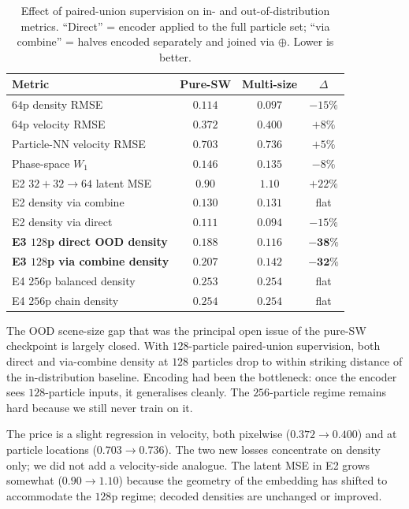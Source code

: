 \documentclass[11pt]{article}
\newcommand{\combine}{\oplus}
\begin{document}
\begin{table}[t]
\centering
\caption{Effect of paired-union supervision on in- and out-of-distribution metrics. ``Direct'' = encoder applied to the full particle set; ``via combine'' = halves encoded separately and joined via $\combine$. Lower is better.}
\label{tab:multisize}
\begin{tabular}{lccc}
\toprule
Metric & Pure-SW & Multi-size & $\Delta$ \\
\midrule
$64$p density RMSE & $0.114$ & $\mathbf{0.097}$ & $-15\%$ \\
$64$p velocity RMSE & $0.372$ & $0.400$ & $+8\%$ \\
Particle-NN velocity RMSE & $0.703$ & $0.736$ & $+5\%$ \\
Phase-space $W_1$ & $0.146$ & $0.135$ & $-8\%$ \\
\midrule
E2 $32{+}32 \to 64$ latent MSE & $0.90$ & $1.10$ & $+22\%$ \\
E2 density via combine & $0.130$ & $0.131$ & flat \\
E2 density via direct & $0.111$ & $0.094$ & $-15\%$ \\
\midrule
\textbf{E3 $128$p direct OOD density} & $0.188$ & $\mathbf{0.116}$ & $\mathbf{-38\%}$ \\
\textbf{E3 $128$p via combine density} & $0.207$ & $\mathbf{0.142}$ & $\mathbf{-32\%}$ \\
\midrule
E4 $256$p balanced density & $0.253$ & $0.254$ & flat \\
E4 $256$p chain density & $0.254$ & $0.254$ & flat \\
\bottomrule
\end{tabular}
\end{table}

The OOD scene-size gap that was the principal open issue of the pure-SW checkpoint is largely closed. With $128$-particle paired-union supervision, both direct and via-combine density at $128$ particles drop to within striking distance of the in-distribution baseline. Encoding had been the bottleneck: once the encoder sees $128$-particle inputs, it generalises cleanly. The $256$-particle regime remains hard because we still never train on it.

The price is a slight regression in velocity, both pixelwise ($0.372 \to 0.400$) and at particle locations ($0.703 \to 0.736$). The two new losses concentrate on density only; we did not add a velocity-side analogue. The latent MSE in E2 grows somewhat ($0.90 \to 1.10$) because the geometry of the embedding has shifted to accommodate the $128$p regime; decoded densities are unchanged or improved.
\end{document}
